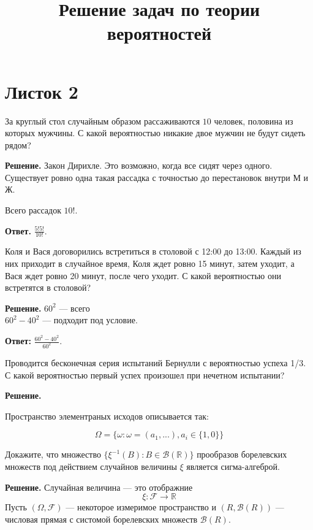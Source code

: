 \documentclass{article}
\title{Решение задач по теории вероятностей}
\begin{document}
\maketitle

\tableofcontents
\section{Листок 2}

За круглый стол случайным образом рассаживаются $10$ человек, половина из которых мужчины. 
С какой вероятностью никакие двое мужчин не будут сидеть рядом?

\textbf{Решение.} 
Закон Дирихле. Это возможно, когда все сидят через одного.
Существует ровно одна такая рассадка с точностью до перестановок внутри М и Ж.

Всего рассадок $10!$.

\textbf{Ответ.}
$\frac{5!5!}{10!}$.


 Коля и Вася договорились встретиться в столовой с 12:00 до 13:00.
Каждый из них приходит в случайное время, Коля ждет ровно 15 минут, затем уходит, а Вася ждет ровно 20 минут, после чего уходит. 
С какой вероятностью они встретятся в столовой?

\textbf{Решение.}
$60^2$ --- всего\\
$60^2-40^2$ --- подходит под условие.

\textbf{Ответ:}
$\frac{60^2-40^2}{60^2}$.


Проводится бесконечная серия испытаний Бернулли с вероятностью успеха 1/3. 
С какой вероятностью первый успех произошел при нечетном испытании?

\textbf{Решение.}

Пространство элементраных исходов описывается так:

$$
\Omega = \{\omega: \omega = (a_1,...), a_i\in\{1,0\}\}
$$




Докажите, что множество 
$\{\xi^{-1}(B): B\in \mathcal{B}(\mathbb{R})\}$ 
прообразов борелевских множеств под действием случайнов величины $\xi$ является сигма-алгеброй.

\textbf{Решение.} Случайная величина --- это отображние 
$$\xi: \mathscr F\to\mathbb{R}$$
Пусть $(\Omega, \mathscr F)$ --- некоторое измеримое пространство и $(R, \mathscr B(R))$ --- числовая прямая с систомой борелевских множеств $\mathscr B(R)$. 
\end{document}
